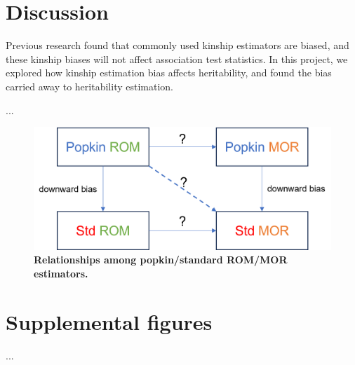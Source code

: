 \documentclass[11pt]{article}
\newcommand{\beginsupplement}{%
  \setcounter{table}{0}
  \renewcommand{\thetable}{S\arabic{table}}%
  \setcounter{figure}{0}
  \renewcommand{\thefigure}{S\arabic{figure}}%
  \setcounter{section}{0}
  \renewcommand{\thesection}{S\arabic{section}}%
  \setcounter{equation}{0}
  \renewcommand{\theequation}{S\arabic{equation}}%
  \setcounter{page}{1}
  \renewcommand{\thepage}{S\arabic{page}}%
}
\begin{document}
\section{Discussion}

Previous research found that commonly used kinship estimators are biased, and these kinship biases will not affect association test statistics. In this project, we explored how kinship estimation bias affects heritability, and found the bias carried away to heritability estimation.













...
\begin{figure}[bp!]
  \centering
  \includegraphics[width=\textwidth]{data/est_relationships.png}
  \caption{
    {\bf Relationships among popkin/standard ROM/MOR estimators.}
    }
  \label{fig:est_relationship}
\end{figure}


\newpage

\printbibliography

\newpage

\beginsupplement

\section{Supplemental figures}
...
\end{document}
